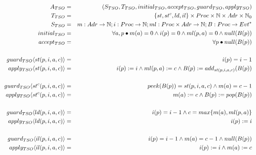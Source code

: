 \begin{eqnarray*}
   A_{TSO} &=& (S_{TSO},T_{TSO},initial_{TSO},accept_{TSO},guard_{TSO},apply_{TSO})
\\ T_{TSO} &=& \{{st,st^c,ld,il}\} \times Proc \times \mathbb{N} \times Adr \times \mathbb{N}_0
\\ S_{TSO} &=& m : Adr \mathrel{\rightarrow} \mathbb{N} ;
               i : Proc \mathrel{\rightarrow} \mathbb{N} ;
               ml : Proc \times Adr \mathrel{\rightarrow} \mathbb{N} ;
               B : Proc \mathrel{\rightarrow} Evt^*
\\ initial_{TSO} &=& \forall a,p \bullet
                   m(a)=0 \land i(p)=0 \land ml(p,a)=0 \land null(B(p))
\\ accept_{TSO} &=& \forall p \bullet null(B(p))
\\
\\ guard_{TSO}\langle{st(p,i,a,c)}\rangle &=& i(p)=i-1
\\ apply_{TSO}\langle{st(p,i,a,c)}\rangle
      &=& i(p):=i \land ml(p,a):=c \land B(p):=add_{st(p,i,a,c)}(B(p))
\\
\\ guard_{TSO}\langle{st^c(p,i,a,c)}\rangle &=& peek(B(p))=st(p,i,a,c) \land m(a)=c-1
\\ apply_{TSO}\langle{st^c(p,i,a,c)}\rangle &=& m(a):=c \land B(p):=pop(B(p))
\\
\\ guard_{TSO}\langle{ld(p,i,a,c)}\rangle &=& i(p)=i-1 \land c = max\{{m(a),ml(p,a)}\}
\\ apply_{TSO}\langle{ld(p,i,a,c)}\rangle &=& i(p):=i
\\
\\ guard_{TSO}\langle{il(p,i,a,c)}\rangle &=& i(p)=i-1 \land m(a)=c-1 \land null(B(p))
\\ apply_{TSO}\langle{il(p,i,a,c)}\rangle &=& i(p):=i \land m(a):=c
\end{eqnarray*}
